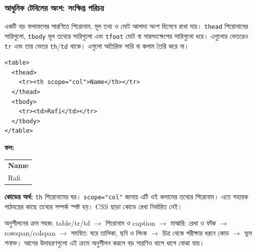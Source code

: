 \subsubsection{আধুনিক টেবিলের অংশ: সংক্ষিপ্ত পরিচয়}
একটি বড় ফলাফলের সারণিতে শিরোনাম, মূল তথ্য ও মোট আলাদা অংশ হিসেবে রাখা যায়। \texttt{thead} শিরোনামের সারিগুলো, \texttt{tbody} মূল তথ্যের সারিগুলো এবং \texttt{tfoot} মোট বা সারসংক্ষেপের সারিগুলো ধরে। এগুলোর ভেতরেও \texttt{tr} এবং তার ভেতর \texttt{th}/\texttt{td} থাকে। এগুলো অতিরিক্ত সারি বা কলাম তৈরি করে না।

\noindent
\begin{minipage}[t]{.50\linewidth}\vspace{0pt}
\begin{verbatim}
<table>
  <thead>
    <tr><th scope="col">Name</th></tr>
  </thead>
  <tbody>
    <tr><td>Rafi</td></tr>
  </tbody>
</table>
\end{verbatim}
\end{minipage}\hfill
\begin{minipage}[t]{.46\linewidth}\vspace{0pt}
\textbf{ফল:}\par
\begin{tabular}{l}
\textbf{Name} \\
Rafi
\end{tabular}\par
\textbf{কোডের অর্থ:} \texttt{th} শিরোনামের ঘর। \texttt{scope="col"} জানায় এটি ওই কলামের তথ্যের শিরোনাম। এতে সহায়ক পাঠযন্ত্রের কাছে তথ্যের সম্পর্ক স্পষ্ট হয়। CSS ছাড়া কোডে রেখা নির্ধারিত নেই।
\end{minipage}

\begin{keypointbox}{অনুশীলনের ক্রম}
সহজ: table/tr/td $\rightarrow$ শিরোনাম ও caption $\rightarrow$ মাঝারি: রেখা ও ফাঁক $\rightarrow$ rowspan/colspan $\rightarrow$ সমন্বিত: ঘরে তালিকা, ছবি ও লিংক $\rightarrow$ চিত্র থেকে পরীক্ষার ধরনে কোড $\rightarrow$ ভুল শনাক্ত। আগের উদাহরণগুলো এই ক্রমে অনুশীলন করলে বড় সারণিও ধাপে ধাপে বোঝা যায়।
\end{keypointbox}
